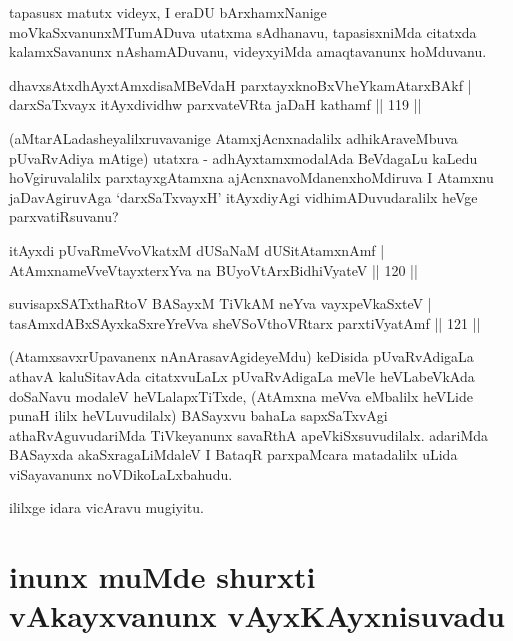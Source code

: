 \begin{artha}
tapasusx matutx videyx, I eraDU bArxhamxNanige moVkaSxvanunxMTumADuva utatxma sAdhanavu, tapasisxniMda citatxda kalamxSavanunx nAshamADuvanu, videyxyiMda amaqtavanunx hoMduvanu.
\end{artha}

\begin{shl}
dhavxsAtxdhAyxtAmxdisaMBeVdaH parxtayxknoBxVheYkamAtarxBAkf |\\
darxSaTxvayx itAyxdividhw parxvateVRta jaDaH kathamf \hfill || 119 ||
\end{shl}

\begin{artha}
(aMtarALadasheyalilxruvavanige AtamxjAcnxnadalilx adhikAraveMbuva pUvaRvAdiya mAtige) utatxra - adhAyxtamxmodalAda BeVdagaLu kaLedu hoVgiruvalalilx parxtayxgAtamxna ajAcnxnavoMdanenxhoMdiruva I Atamxnu jaDavAgiruvAga `darxSaTxvayxH' itAyxdiyAgi vidhimADuvudaralilx heVge parxvatiRsuvanu?
\end{artha}


\begin{shl}
itAyxdi pUvaRmeVvoVkatxM dUSaNaM dUSitAtamxnAmf |\\
AtAmxnameVveVtayxterxYva na BUyoV\s tArxBidhiVyateV \hfill || 120 ||
\end{shl}

\begin{shl}
suvisapxSATxthaRtoV BASayxM TiVkAM neYva vayxpeVkaSxteV |\\
tasAmxdABxSAyxkaSxreYreVva sheVSoV\s thoVR\s tarx parxtiVyatAmf \hfill || 121 ||
\end{shl}

\begin{artha}
(AtamxsavxrUpavanenx nAnArasavAgideyeMdu) keDisida pUvaRvAdigaLa athavA kaluSitavAda citatxvuLaLx pUvaRvAdigaLa meVle heVLabeVkAda doSaNavu modaleV heVLalapxTiTxde, (AtAmxna meVva eMbalilx heVLide punaH ililx heVLuvudilalx) BASayxvu bahaLa sapxSaTxvAgi athaRvAguvudariMda TiVkeyanunx savaRthA apeVkiSxsuvudilalx. adariMda BASayxda akaSxragaLiMdaleV I BataqR parxpaMcara matadalilx uLida viSayavanunx noVDikoLaLxbahudu.
\end{artha}
	
\begin{center}
ililxge idara vicAravu mugiyitu.
\end{center}

\section*{inunx muMde shurxti vAkayxvanunx vAyxKAyxnisuvadu}

